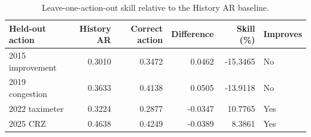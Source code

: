 \begin{table}[H]
\caption{Leave-one-action-out skill relative to the History AR baseline.}
\label{tab:tab2_fold_skill}
\small
\begin{tabular}{lrrrrl}
\toprule
Held-out action & History AR & Correct action & Difference & Skill (\%) & Improves \\
\midrule
2015 improvement & 0.3010 & 0.3472 & 0.0462 & -15.3465 & No \\
2019 congestion & 0.3633 & 0.4138 & 0.0505 & -13.9118 & No \\
2022 taximeter & 0.3224 & 0.2877 & -0.0347 & 10.7765 & Yes \\
2025 CRZ & 0.4638 & 0.4249 & -0.0389 & 8.3861 & Yes \\
\bottomrule
\end{tabular}
\end{table}
